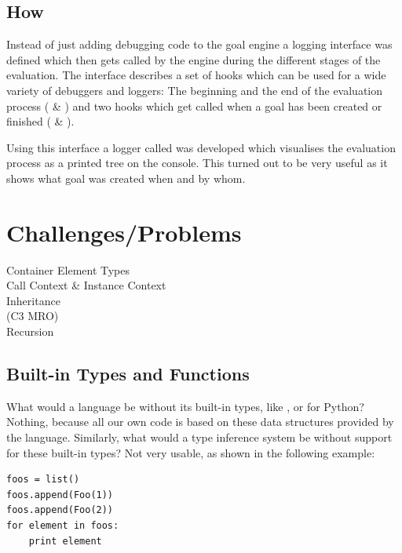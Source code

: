 \documentclass[12pt,halfparskip]{scrreprt}
\begin{document}
\subsection{How}


Instead of just adding debugging code to the goal engine a logging interface was defined which then gets called by the engine during the different stages of the evaluation. The interface  describes a set of hooks which can be used for a wide variety of debuggers and loggers: The beginning and the end of the evaluation process ( \& ) and two hooks which get called when a goal has been created or finished ( \& ).

Using this interface a logger called  was developed which visualises the evaluation process as a printed tree on the console. This turned out to be very useful as it shows what goal was created when and by whom.




\section{Challenges/Problems}
Container Element Types \\
Call Context \& Instance Context \\
Inheritance\\
 (C3 MRO)\\
Recursion\\

\subsection{Built-in Types and Functions}


What would a language be without its built-in types, like ,  or  for Python? Nothing, because all our own code is based on these data structures provided by the language. Similarly, what would a type inference system be without support for these built-in types? Not very usable, as shown in the following example:

\begin{lstlisting}
foos = list()
foos.append(Foo(1))
foos.append(Foo(2))
for element in foos:
    print element
\end{lstlisting}
\end{document}

